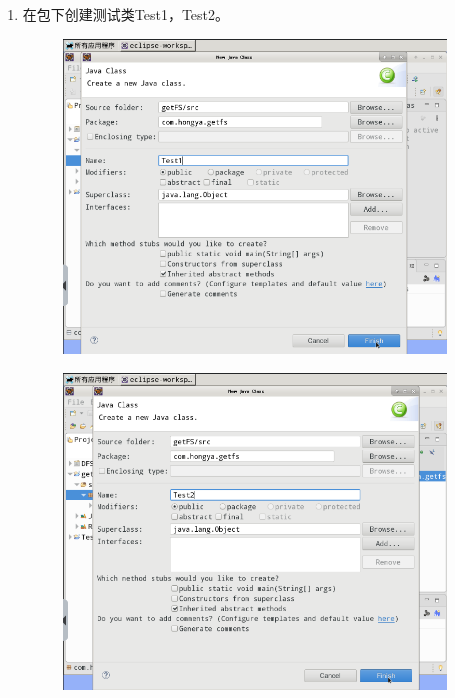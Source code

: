 \documentclass {article}
\begin{document}
\begin{enumerate}
					\item 在包下创建测试类Test1，Test2。
					\begin{figure}[H]
						\centering
						\includegraphics[width=4in]{figures/fig14.png}
					\end{figure}
					\begin{figure}[H]
						\centering
						\includegraphics[width=4in]{figures/fig15.png}
					\end{figure}
				\end{enumerate}
			
\end{document}
